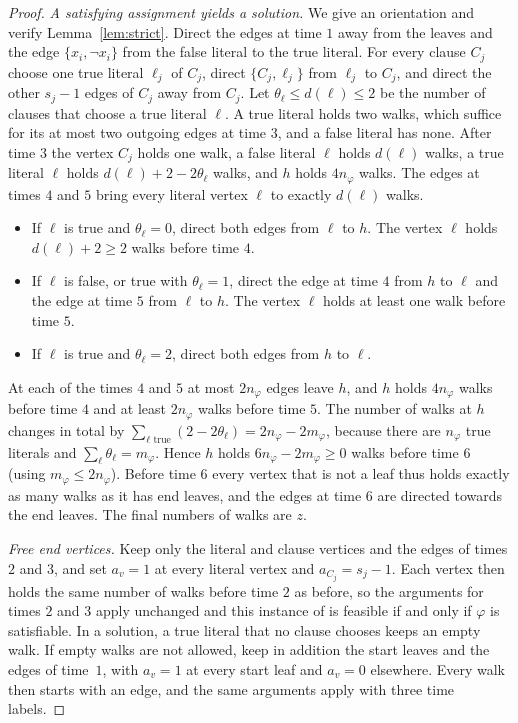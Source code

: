 \begin{proof}
\emph{A satisfying assignment yields a solution.} We give an orientation and verify Lemma~\ref{lem:strict}. Direct the edges at time $1$ away from the leaves and the edge $\{x_i,\lnot x_i\}$ from the false literal to the true literal. For every clause $C_j$ choose one true literal $\ell_j$ of $C_j$, direct $\{C_j,\ell_j\}$ from $\ell_j$ to $C_j$, and direct the other $s_j-1$ edges of $C_j$ away from $C_j$. Let $\theta_\ell\le d(\ell)\le2$ be the number of clauses that choose a true literal $\ell$. A true literal holds two walks, which suffice for its at most two outgoing edges at time $3$, and a false literal has none. After time $3$ the vertex $C_j$ holds one walk, a false literal $\ell$ holds $d(\ell)$ walks, a true literal $\ell$ holds $d(\ell)+2-2\theta_\ell$ walks, and $h$ holds $4n_\varphi$ walks. The edges at times $4$ and $5$ bring every literal vertex $\ell$ to exactly $d(\ell)$ walks.
\begin{itemize}
\item If $\ell$ is true and $\theta_\ell=0$, direct both edges from $\ell$ to $h$. The vertex $\ell$ holds $d(\ell)+2\ge2$ walks before time $4$.
\item If $\ell$ is false, or true with $\theta_\ell=1$, direct the edge at time $4$ from $h$ to $\ell$ and the edge at time $5$ from $\ell$ to $h$. The vertex $\ell$ holds at least one walk before time $5$.
\item If $\ell$ is true and $\theta_\ell=2$, direct both edges from $h$ to $\ell$.
\end{itemize}
At each of the times $4$ and $5$ at most $2n_\varphi$ edges leave $h$, and $h$ holds $4n_\varphi$ walks before time $4$ and at least $2n_\varphi$ walks before time $5$. The number of walks at $h$ changes in total by $\sum_{\ell\text{ true}}(2-2\theta_\ell)=2n_\varphi-2m_\varphi$, because there are $n_\varphi$ true literals and $\sum_\ell\theta_\ell=m_\varphi$. Hence $h$ holds $6n_\varphi-2m_\varphi\ge0$ walks before time $6$ (using $m_\varphi\le2n_\varphi$). Before time $6$ every vertex that is not a leaf thus holds exactly as many walks as it has end leaves, and the edges at time $6$ are directed towards the end leaves. The final numbers of walks are $z$.

\emph{Free end vertices.} Keep only the literal and clause vertices and the edges of times $2$ and $3$, and set $a_v=1$ at every literal vertex and $a_{C_j}=s_j-1$. Each vertex then holds the same number of walks before time $2$ as before, so the arguments for times $2$ and $3$ apply unchanged and this instance of \SFREE{} is feasible if and only if $\varphi$ is satisfiable. In a solution, a true literal that no clause chooses keeps an empty walk. If empty walks are not allowed, keep in addition the start leaves and the edges of time~$1$, with $a_v=1$ at every start leaf and $a_v=0$ elsewhere. Every walk then starts with an edge, and the same arguments apply with three time labels.
\end{proof}

